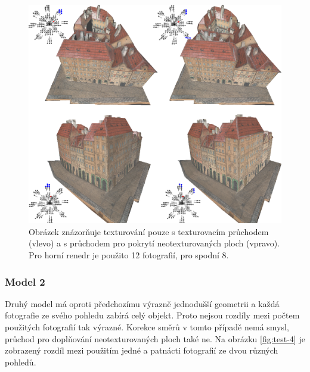 \documentclass[11pt,twoside,a4paper]{book}
\begin{document}
\begin{figure}[h!]
\begin{center}
\includegraphics[width=\textwidth]{figures/test-3}
\caption{Obrázek znázorňuje texturování pouze s texturovacím průchodem (vlevo) a s průchodem pro pokrytí neotexturovaných ploch (vpravo). Pro horní renedr je použito 12 fotografií, pro spodní 8.}
\label{fig:test-3}
\end{center}
\end{figure}

\newpage %
\subsubsection*{Model 2}

Druhý model má oproti předchozímu výrazně jednodušší geometrii a každá fotografie ze svého pohledu zabírá celý objekt. Proto nejsou rozdíly mezi počtem použitých fotografií tak výrazné. Korekce směrů v tomto případě nemá smysl, průchod pro doplňování neotexturovaných ploch také ne. Na obrázku \ref{fig:test-4} je zobrazený rozdíl mezi použitím jedné a patnácti fotografií ze dvou různých pohledů.
\end{document}

